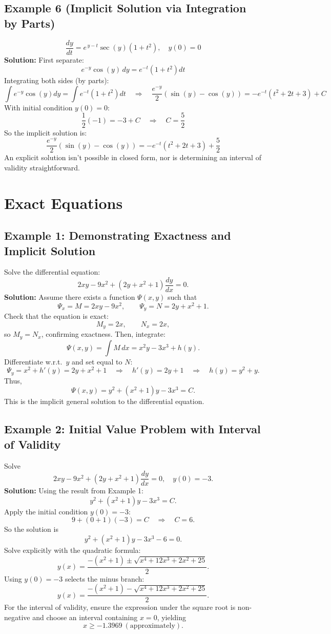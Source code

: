 \documentclass[12pt]{book}
\begin{document}
\subsection*{Example 6 (Implicit Solution via Integration by Parts)}
\[
\frac{dy}{dt} = e^{\,y - t} \sec(y)(1 + t^2),\quad y(0) = 0
\]
\textbf{Solution:}
First separate:
\[
e^{-y} \cos(y)\, dy = e^{-t}(1 + t^2) dt
\]
Integrating both sides (by parts):
\[
\int e^{-y}\cos(y)dy = \int e^{-t}(1 + t^2)dt \quad\Longrightarrow\quad \frac{e^{-y}}{2}(\sin(y) - \cos(y)) = -e^{-t}(t^2 + 2t + 3) + C
\]
With initial condition \(y(0)=0\):
\[
\frac{1}{2}(-1) = -3 + C \quad\Rightarrow\quad C = \frac{5}{2}
\]
So the implicit solution is:
\[
\frac{e^{-y}}{2}(\sin(y) - \cos(y)) = -e^{-t}(t^2 + 2t + 3) + \frac{5}{2}
\]
An explicit solution isn’t possible in closed form, nor is determining an interval of validity straightforward.

\section{Exact Equations}

\subsection*{Example 1: Demonstrating Exactness and Implicit Solution}
Solve the differential equation:
\[
2xy - 9x^2 + \left(2y + x^2 + 1\right)\frac{dy}{dx} = 0.
\]
\textbf{Solution:}
Assume there exists a function \(\Psi(x,y)\) such that
\[
\Psi_x = M = 2xy - 9x^2, 
\qquad
\Psi_y = N = 2y + x^2 + 1.
\]
Check that the equation is exact:
\[
M_y = 2x, 
\qquad 
N_x = 2x,
\]
so \(M_y = N_x\), confirming exactness.  
Then, integrate:
\[
\Psi(x,y) = \int M \,dx
= x^2y - 3x^3 + h(y).
\]
Differentiate w.r.t.\ \(y\) and set equal to \(N\):
\[
\Psi_y = x^2 + h'(y) = 2y + x^2 + 1 \quad\Longrightarrow\quad h'(y) = 2y + 1
\quad\Longrightarrow\quad h(y) = y^2 + y.
\]
Thus,
\[
\Psi(x,y) = y^2 + (x^2 + 1)y - 3x^3 = C.
\]
This is the implicit general solution to the differential equation.

\subsection*{Example 2: Initial Value Problem with Interval of Validity}
Solve
\[
2xy - 9x^2 + (2y + x^2 + 1)\frac{dy}{dx} = 0, \quad y(0) = -3.
\]
\textbf{Solution:}
Using the result from Example 1:
\[
y^2 + (x^2 + 1)y - 3x^3 = C.
\]
Apply the initial condition \(y(0) = -3\):
\[
9 + (0 + 1)(-3) = C \quad\Longrightarrow\quad C = 6.
\]
So the solution is
\[
y^2 + (x^2 + 1)y - 3x^3 - 6 = 0.
\]
Solve explicitly with the quadratic formula:
\[
y(x) = \frac{-(x^2 + 1) \pm \sqrt{x^4 + 12x^3 + 2x^2 + 25}}{2}.
\]
Using \(y(0)=-3\) selects the minus branch:
\[
y(x) = \frac{-(x^2 + 1) - \sqrt{x^4 + 12x^3 + 2x^2 + 25}}{2}.
\]
For the interval of validity, ensure the expression under the square root is non-negative and choose an interval containing \(x=0\), yielding
\[
x \geq -1.3969\ (\text{approximately}).
\]
\end{document}
